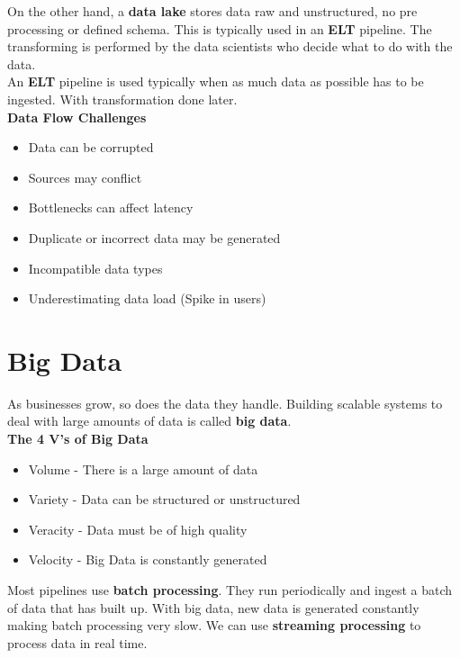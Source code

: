 On the other hand, a \textbf{data lake} stores data raw and unstructured, no pre processing
or defined schema. This is typically used in an \textbf{ELT} pipeline. The transforming
is performed by the data scientists who decide what to do with the data.\\

An \textbf{ELT} pipeline is used typically when as much data as possible has to be ingested. With
transformation done later.\\

\textbf{Data Flow Challenges}

\begin{itemize}
    \item Data can be corrupted
    \item Sources may conflict
    \item Bottlenecks can affect latency
    \item Duplicate or incorrect data may be generated
    \item Incompatible data types
    \item Underestimating data load (Spike in users)
\end{itemize}

\section{Big Data}

As businesses grow, so does the data they handle. Building scalable systems to deal
with large amounts of data is called \textbf{big data}.\\

\textbf{The 4 V's of Big Data}

\begin{itemize}
    \item Volume - There is a large amount of data
    \item Variety - Data can be structured or unstructured
    \item Veracity - Data must be of high quality
    \item Velocity - Big Data is constantly generated
\end{itemize}

Most pipelines use \textbf{batch processing}. They run periodically and ingest a batch of
data that has built up. With big data, new data is generated constantly making batch processing
very slow. We can use \textbf{streaming processing} to process data in real time.\\

